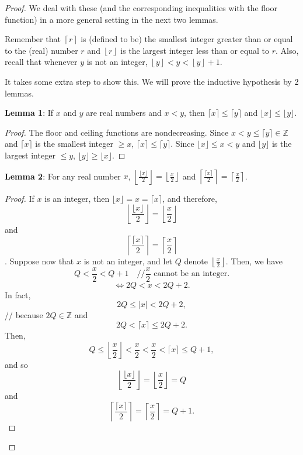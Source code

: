 \begin{proof}
        We deal with these (and the corresponding inequalities with the floor function) in a more general setting in the next two lemmas.

        Remember that $\left\lceil r \right\rceil$ is (defined to be) the smallest integer greater than or equal 
        to the (real) number $r$ and $\left\lfloor r \right\rfloor$ is the largest integer less than or equal 
        to $r$. Also, recall that whenever $y$ is not an integer, $\left\lfloor y \right\rfloor < y < \left\lfloor y \right\rfloor + 1$.
        
        It takes some extra step to show this. We will prove the inductive hypothesis by 2 lemmas.

        \noindent \textbf{Lemma 1}: If \( x \) and \( y \) are real numbers and \( x < y \), then \( \lceil x \rceil \leq \lceil y \rceil \) and \( \lfloor x \rfloor \leq \lfloor y \rfloor \).
        \begin{proof}
            The floor and ceiling functions are nondecreasing.
            Since \( x < y \leq \lceil y \rceil \in \mathbb{Z} \) and \( \lceil x \rceil \) is the smallest integer \( \geq x \), \( \lceil x \rceil \leq \lceil y \rceil \).
            Since \( \lfloor x \rfloor \leq x < y \) and \( \lfloor y \rfloor \) is the largest integer \( \leq y \), \( \lfloor y \rfloor \geq \lfloor x \rfloor \).
        \end{proof}

        \noindent \textbf{Lemma 2}: For any real number \(x\), \(\left\lfloor \frac{\lfloor x\rfloor}{2} \right\rfloor = \left\lfloor \frac{x}{2} \right\rfloor\) and \(\left\lceil \frac{\lceil x\rceil}{2} \right\rceil = \left\lceil \frac{x}{2} \right\rceil\).
        \begin{proof}
            If \(x\) is an integer, then \(\lfloor x\rfloor = x = \lceil x\rceil\), and therefore,
            \[
            \left\lfloor \frac{\lfloor x\rfloor}{2} \right\rfloor = \left\lfloor \frac{x}{2} \right\rfloor
            \]
            and
            \[
            \left\lceil \frac{\lceil x\rceil}{2} \right\rceil = \left\lceil \frac{x}{2} \right\rceil
            \].
            Suppose now that \(x\) is not an integer, and let \(Q\) denote \(\left\lfloor \frac{x}{2} \right\rfloor\). Then, we have
            \[
            Q < \frac{x}{2} < Q + 1 \quad // \frac{x}{2} \text{ cannot be an integer.}
            \]
            \[
            \Leftrightarrow 2Q < x < 2Q + 2.
            \]
            In fact,
            \[
            2Q \leq \lvert x\rvert < 2Q + 2,
            \]
            // because \(2Q \in \mathbb{Z}\)
            and
            \[
            2Q < \lceil x\rceil \leq 2Q + 2.
            \]
            Then,
            \[
            Q \leq \left\lfloor \frac{x}{2} \right\rfloor < \frac{x}{2} < \frac{x}{2} < \lceil x\rceil \leq Q + 1,
            \]
            and so
            \[
            \left\lfloor \frac{\lfloor x\rfloor}{2} \right\rfloor = \left\lfloor \frac{x}{2} \right\rfloor = Q
            \]
            and
            \[
            \left\lceil \frac{\lceil x\rceil}{2} \right\rceil = \left\lceil \frac{x}{2} \right\rceil = Q + 1.
            \]
        \end{proof}
    

\end{proof}
